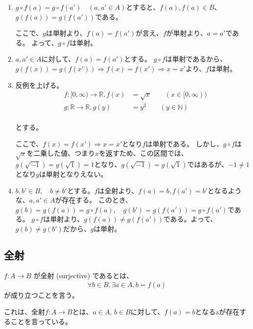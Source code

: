 \documentclass[dvipdfmx,autodetect-engine]{jsarticle}
\begin{document}
\begin{enumerate}
\renewcommand{\labelenumi}{(\arabic{enumi})}
	\item $g \circ f(a) = g \circ f(a') \quad (a, a' \in A)$とすると、$f(a), f(a) \in B$、$g(f(a))　= g(f(a'))$である。
	
	ここで、$g$は単射より、$f(a) = f(a')$が言え、$f$が単射より、$a = a'$である。
	よって、$g \circ f$は単射。
	
	\item $a,a' \in A$に対して、$f(a) = f(a')$とする。
	$g \circ f$は単射であるから、$g(f(x)) = g(f(x')) \Rightarrow f(x) = f(x') \Rightarrow x = x'$より、$f$は単射。

    \item 反例を上げる。
    \begin{eqnarray*}
    &f:[0,∞) \to \mathbb{R}, f(x) &= \sqrt{x} \quad \quad (x \in [0,∞)) \\
    &g:\mathbb{R} \to \mathbb{R}, g(y) &= y^2  \quad \quad (y \in \mathbb{N}) \\
    \end{eqnarray*}
    
    とする。
    
    ここで、$f(x) = f(x') \Rightarrow x = x'$となり$f$は単射である。
    しかし、$g \circ f$は$\sqrt{x}$を二乗した値、つまり$x$を返すため、この区間では、$g(\sqrt{-1}) = g(\sqrt{1}) = 1$となり、$g(\sqrt{-1}) = g(\sqrt{1})$ではあるが、$-1 \neq 1$となり$g$は単射となりえない。
    
    \item $b, b' \in B, \quad b \neq b'$とする。$f$は全射より、$f(a) = b, f(a') = b'$となるような、$a, a' \in A$が存在する。
    このとき、$g(b) = g(f(a)) = g \circ f(a), \quad g(b') = g(f(a')) = g \circ f(a')$である。
    $g \circ f$は単射より、$g(f(a)) \neq g(f(a'))$である。よって、$g(b) \neq g(b')$だから、$g$は単射。
	
\end{enumerate}

\subsection{全射}

$f: A \to B$ が全射 (surjective) であるとは、
\begin{eqnarray*}
\forall b \in B, \exists a \in A, b = f(a)
\end{eqnarray*}
が成り立つことを言う。

これは、全射$f: A \to B$とは、$a \in A$, $b \in B$に対して、$f(a) = b$となるaが存在することを言っている。
\end{document}
